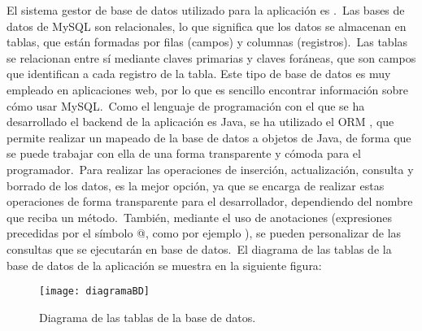 
El sistema gestor de base de datos utilizado para la aplicación es .\ Las bases de datos de MySQL son
relacionales, lo que significa que los datos se almacenan en tablas, que están formadas por filas (campos) y columnas
(registros).\ Las tablas se relacionan entre sí mediante claves primarias y claves foráneas, que son campos que
identifican a cada registro de la tabla.
Este tipo de base de datos es muy empleado en aplicaciones web, por lo que es sencillo encontrar información sobre
cómo usar MySQL\@.\ Como el lenguaje de programación con el que se ha desarrollado el backend de la aplicación es
Java, se ha utilizado el ORM , que permite realizar un mapeado de la base de datos a objetos de
Java, de forma que se puede trabajar con ella de una forma transparente y cómoda para el programador.\ Para realizar
las operaciones de inserción, actualización, consulta y borrado de los datos,  es la
mejor opción, ya que se encarga de realizar estas operaciones de forma transparente para el desarrollador,
dependiendo del nombre que reciba un método.\ También, mediante el uso de anotaciones (expresiones precedidas por el
símbolo @, como por ejemplo ), se pueden personalizar de las consultas que se ejecutarán en base de
datos.\ El diagrama de las tablas de la base de datos de la aplicación se muestra en la siguiente figura:

\begin{figure}[H]
	\centering
	\texttt{[image: diagramaBD]}
	\caption{Diagrama de las tablas de la base de datos.}
	\label{fig:diagrama-tablas}
\end{figure}

